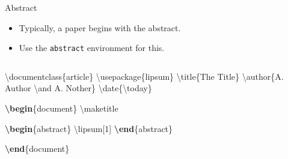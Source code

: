 \documentclass[,aspectratio=43]{beamer}
\newenvironment{Shaded}{\begin{snugshade}}{\end{snugshade}}
\newcommand{\BuiltInTok}[1]{#1}
\newcommand{\ExtensionTok}[1]{#1}
\newcommand{\FunctionTok}[1]{\textcolor[rgb]{0.02,0.16,0.49}{#1}}
\newcommand{\KeywordTok}[1]{\textcolor[rgb]{0.00,0.44,0.13}{\textbf{#1}}}
\newcommand{\NormalTok}[1]{#1}
\begin{document}
\begin{frame}[fragile]{Abstract}
\protect\hypertarget{abstract}{}
\begin{itemize}
\item
  Typically, a paper begins with the abstract.
\item
  Use the \texttt{abstract} environment for this.
\end{itemize}

\begin{columns}[T]
\begin{column}{0.53\textwidth}
\small
\vspace{-1em}

\begin{Shaded}
\begin{Highlighting}[]
\BuiltInTok{\textbackslash{}documentclass}\NormalTok{\{}\ExtensionTok{article}\NormalTok{\}}
\BuiltInTok{\textbackslash{}usepackage}\NormalTok{\{}\ExtensionTok{lipsum}\NormalTok{\}}
\FunctionTok{\textbackslash{}title}\NormalTok{\{The Title\}}
\FunctionTok{\textbackslash{}author}\NormalTok{\{A. Author }\FunctionTok{\textbackslash{}and}\NormalTok{ A. Nother\}}
\FunctionTok{\textbackslash{}date}\NormalTok{\{}\FunctionTok{\textbackslash{}today}\NormalTok{\}}

\KeywordTok{\textbackslash{}begin}\NormalTok{\{}\ExtensionTok{document}\NormalTok{\} }
\FunctionTok{\textbackslash{}maketitle}

\KeywordTok{\textbackslash{}begin}\NormalTok{\{}\ExtensionTok{abstract}\NormalTok{\}}
\FunctionTok{\textbackslash{}lipsum}\NormalTok{[1]}
\KeywordTok{\textbackslash{}end}\NormalTok{\{}\ExtensionTok{abstract}\NormalTok{\}}

\KeywordTok{\textbackslash{}end}\NormalTok{\{}\ExtensionTok{document}\NormalTok{\}}
\end{Highlighting}
\end{Shaded}
\end{column}


\end{columns}
\end{frame}
\end{document}
